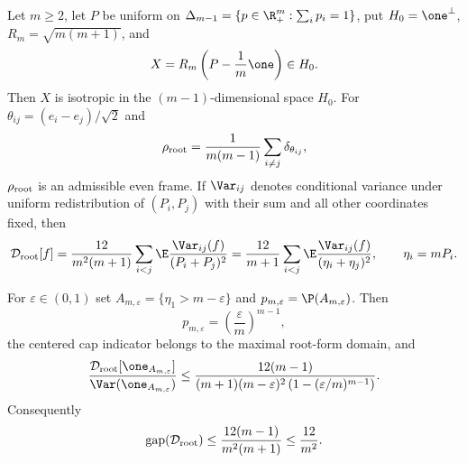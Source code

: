 \documentclass[../main.tex]{subfiles}
\begin{document}
\begin{proposition}
\label{prop:sol-conditional-fiber-root-obstruction}
Let $m\ge2$, let $P$ be uniform on
$\Delta_{m-1}=\{p\in\R_+^m:\sum_i p_i=1\}$, put
$H_0=\one^\perp$, $R_m=\sqrt{m(m+1)}$, and
\begin{equation}
 X=R_m\left(P-\frac1m\one\right)\in H_0.
\end{equation}
Then $X$ is isotropic in the $(m-1)$-dimensional space $H_0$.  For
$\theta_{ij}=(e_i-e_j)/\sqrt2$ and
\begin{equation}
 \rho_{\rm root}=\frac1{m(m-1)}\sum_{i\ne j}\delta_{\theta_{ij}},
\end{equation}
$\rho_{\rm root}$ is an admissible even frame.  If $\Var_{ij}$ denotes conditional variance
under uniform redistribution of $(P_i,P_j)$ with their sum and all other coordinates fixed,
then
\begin{equation}
 \mathcal D_{\rm root}[f]
 =\frac{12}{m^2(m+1)}\sum_{i<j}
   \E\frac{\Var_{ij}(f)}{(P_i+P_j)^2}
 =\frac{12}{m+1}\sum_{i<j}
   \E\frac{\Var_{ij}(f)}{(\eta_i+\eta_j)^2},
 \qquad \eta_i=mP_i.
 \label{eq:sol-fiber-root-form}
\end{equation}

For $\varepsilon\in(0,1)$ set
$A_{m,\varepsilon}=\{\eta_1>m-\varepsilon\}$ and
$p_{m,\varepsilon}=\P(A_{m,\varepsilon})$.  Then
\begin{equation}
 p_{m,\varepsilon}=\left(\frac\varepsilon m\right)^{m-1},
 \label{eq:sol-fiber-cap-probability}
\end{equation}
the centered cap indicator belongs to the maximal root-form domain, and
\begin{equation}
 \frac{\mathcal D_{\rm root}[\one_{A_{m,\varepsilon}}]}
      {\Var(\one_{A_{m,\varepsilon}})}
 \le
 \frac{12(m-1)}{(m+1)(m-\varepsilon)^2
   \left(1-(\varepsilon/m)^{m-1}\right)}.
 \label{eq:sol-fiber-cap-rayleigh}
\end{equation}
Consequently
\begin{equation}
 \operatorname{gap}(\mathcal D_{\rm root})
 \le \frac{12(m-1)}{m^2(m+1)}
 \le\frac{12}{m^2}.
 \label{eq:sol-fiber-root-gap}
\end{equation}
\end{proposition}
\end{document}
